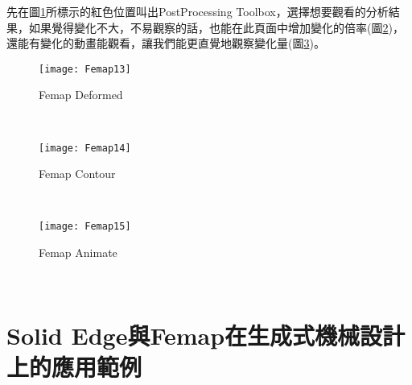 \begin{itemize}
\qquad 先在圖\ref{3.13}所標示的紅色位置叫出PostProcessing Toolbox，選擇想要觀看的分析結果，如果覺得變化不大，不易觀察的話，也能在此頁面中增加變化的倍率(圖\ref{3.14})，還能有變化的動畫能觀看，讓我們能更直覺地觀察變化量(圖\ref{3.15})。\\
\begin{figure}[hbt!]
\begin{center}
\texttt{[image: Femap13]}
\caption{\Large Femap Deformed}\label{3.13}
\end{center}
\end{figure}
\\
\begin{figure}[hbt!]
\begin{center}
\texttt{[image: Femap14]}
\caption{\Large Femap Contour}\label{3.14}
\end{center}
\end{figure}
\\
\begin{figure}[hbt!]
\begin{center}
\texttt{[image: Femap15]}
\caption{\Large Femap Animate}\label{3.15}
\end{center}
\end{figure}
\\
\end{itemize}

\section{Solid Edge與Femap在生成式機械設計上的應用範例}
















\newpage